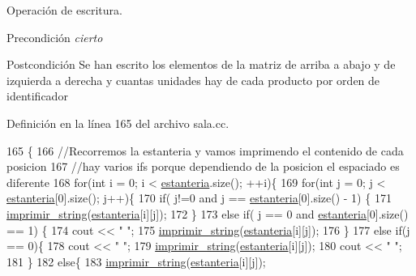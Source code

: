 Operación de escritura. 

\begin{DoxyPrecond}{Precondición}
{\itshape cierto} 
\end{DoxyPrecond}
\begin{DoxyPostcond}{Postcondición}
Se han escrito los elementos de la matriz de arriba a abajo y de izquierda a derecha y cuantas unidades hay de cada producto por orden de identificador 
\end{DoxyPostcond}


Definición en la línea 165 del archivo sala.\+cc.


\begin{DoxyCode}
165                          \{
166     \textcolor{comment}{//Recorremos la estanteria y vamos imprimendo el contenido de cada posicion}
167     \textcolor{comment}{//hay varios ifs porque dependiendo de la posicion el espaciado es diferente}
168     \textcolor{keywordflow}{for}(\textcolor{keywordtype}{int} i = 0; i < \mbox{\hyperlink{class_sala_a8f5264818c98db9c0d075c51a7672d95}{estanteria}}.size(); ++i)\{
169         \textcolor{keywordflow}{for}(\textcolor{keywordtype}{int} j = 0; j < \mbox{\hyperlink{class_sala_a8f5264818c98db9c0d075c51a7672d95}{estanteria}}[0].size(); j++)\{
170             \textcolor{keywordflow}{if}( j!=0 and j == \mbox{\hyperlink{class_sala_a8f5264818c98db9c0d075c51a7672d95}{estanteria}}[0].size() - 1) \{
171                 \mbox{\hyperlink{sala_8cc_ac1916f29be6c9137b2df1079e26c54f3}{imprimir\_string}}(\mbox{\hyperlink{class_sala_a8f5264818c98db9c0d075c51a7672d95}{estanteria}}[i][j]);
172             \}
173             \textcolor{keywordflow}{else} \textcolor{keywordflow}{if}( j == 0 and \mbox{\hyperlink{class_sala_a8f5264818c98db9c0d075c51a7672d95}{estanteria}}[0].size() == 1) \{
174                 cout << \textcolor{stringliteral}{"  "};
175                 \mbox{\hyperlink{sala_8cc_ac1916f29be6c9137b2df1079e26c54f3}{imprimir\_string}}(\mbox{\hyperlink{class_sala_a8f5264818c98db9c0d075c51a7672d95}{estanteria}}[i][j]);
176             \}
177             \textcolor{keywordflow}{else} \textcolor{keywordflow}{if}(j == 0)\{
178                 cout << \textcolor{stringliteral}{"  "};
179                 \mbox{\hyperlink{sala_8cc_ac1916f29be6c9137b2df1079e26c54f3}{imprimir\_string}}(\mbox{\hyperlink{class_sala_a8f5264818c98db9c0d075c51a7672d95}{estanteria}}[i][j]);
180                 cout << \textcolor{stringliteral}{" "};
181             \}
182             \textcolor{keywordflow}{else}\{
183                 \mbox{\hyperlink{sala_8cc_ac1916f29be6c9137b2df1079e26c54f3}{imprimir\_string}}(\mbox{\hyperlink{class_sala_a8f5264818c98db9c0d075c51a7672d95}{estanteria}}[i][j]);

\end{DoxyCode}
